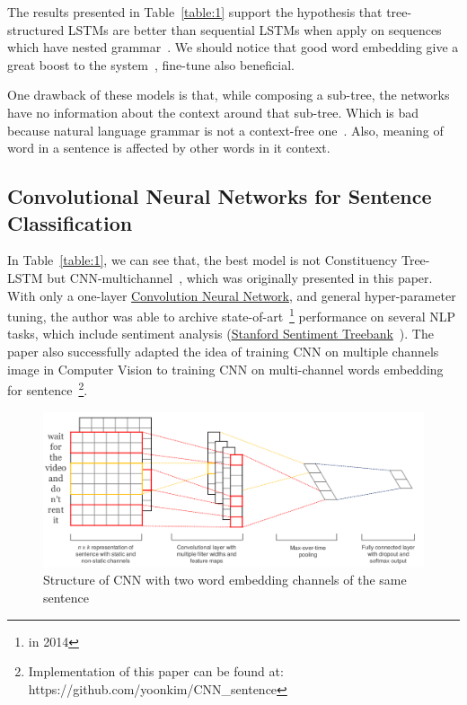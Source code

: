 The results presented in Table~\ref{table:1} support the hypothesis that tree-structured LSTMs are better than sequential LSTMs when apply on sequences which have nested grammar~\cite{treeVSseq}. 
We should notice that good word embedding give a great boost to the system~\cite{Luong_betterword}, fine-tune also beneficial.

One drawback of these models is that, while composing a sub-tree, the networks have no information about the context around that sub-tree.
Which is bad because natural language grammar is not a context-free one~\cite{noContextFree}.
Also, meaning of word in a sentence is affected by other words in it context.

\subsection{Convolutional Neural Networks for Sentence Classification}
In Table~\ref{table:1}, we can see that, the best model is not Constituency Tree-LSTM but CNN-multichannel~\cite{KimCNN}, which was originally presented in this paper. 
With only a one-layer \hyperref[sec:cnn]{Convolution Neural Network}, and general hyper-parameter tuning, the author was able to archive state-of-art~\footnote{in 2014} performance on several NLP tasks, which include sentiment analysis (\hyperref[sec:sst]{Stanford Sentiment Treebank}~\cite{socher2013recursive}). 
The paper also successfully adapted the idea of training CNN on multiple channels image in Computer Vision to training CNN on multi-channel words embedding for sentence~\footnote{Implementation of this paper can be found at: https://github.com/yoonkim/CNN\_sentence}.

\begin{figure}[H]
	\centering
	\includegraphics[scale=0.33]{figure/sentencecnn}
	\caption{Structure of CNN with two word embedding channels of the same sentence}
	\label{fig:treecp}
\end{figure}

